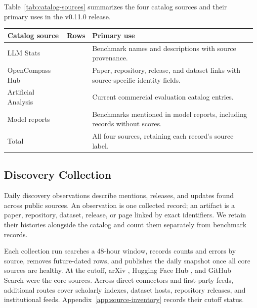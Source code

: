 \documentclass[11pt]{article}
\newcommand{\ReportNumber}[1]{\pgfmathprintnumber[fixed,precision=0,1000 sep={,},assume math mode=true]{#1}}
\begin{document}
Table~\ref{tab:catalog-sources} summarizes the four catalog sources and their primary uses in the v0.11.0 release.

\begin{center}
\centering\small
\begin{tabularx}{\textwidth}{L{0.23\textwidth}r Y}
\toprule
\textbf{Catalog source} & \textbf{Rows} & \textbf{Primary use}\\
\midrule
LLM Stats & \ReportLLMStatsCount{} & Benchmark names and descriptions with source provenance.\\
OpenCompass Hub & \ReportOpenCompassCount{} & Paper, repository, release, and dataset links with source-specific identity fields.\\
Artificial Analysis & \ReportArtificialAnalysisCount{} & Current commercial evaluation catalog entries.\\
Model reports & \ReportModelReportCount{} & Benchmarks mentioned in model reports, including records without scores.\\
\midrule
Total & \ReportNumber{\ReportCatalogCount} & All four sources, retaining each record's source label.\\
\bottomrule
\end{tabularx}
\label{tab:catalog-sources}
\end{center}

\subsection{Discovery Collection}

Daily discovery observations describe mentions, releases, and updates found across public sources. An observation is one collected record; an artifact is a paper, repository, dataset, release, or page linked by exact identifiers. We retain their histories alongside the catalog and count them separately from benchmark records.

Each collection run searches a 48-hour window, records counts and errors by source, removes future-dated rows, and publishes the daily snapshot once all core sources are healthy. At the cutoff, arXiv \citep{arxivapi}, Hugging Face Hub \citep{huggingfacehub}, and GitHub Search \citep{githubsearchdocs} were the core sources. Across \ReportConnectorCount{} direct connectors and \ReportFirstPartyFeedCount{} first-party feeds, additional routes cover scholarly indexes, dataset hosts, repository releases, and institutional feeds. Appendix~\ref{app:source-inventory} records their cutoff status.
\end{document}
